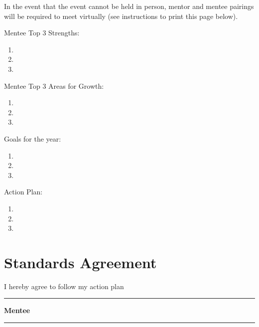 \documentclass[
  openany]{book}
\providecommand{\tightlist}{%
  \setlength{\itemsep}{0pt}\setlength{\parskip}{0pt}}
\begin{document}
In the event that the event cannot be held in person, mentor and mentee pairings will be required to meet virtually (see instructions to print this page below).

Mentee Top 3 Strengths:

\begin{enumerate}
\def\labelenumi{\arabic{enumi}.}
\tightlist
\item
\item
\item
\end{enumerate}

Mentee Top 3 Areas for Growth:

\begin{enumerate}
\def\labelenumi{\arabic{enumi}.}
\tightlist
\item
\item
\item
\end{enumerate}

Goals for the year:

\begin{enumerate}
\def\labelenumi{\arabic{enumi}.}
\tightlist
\item
\item
\item
\end{enumerate}

Action Plan:

\begin{enumerate}
\def\labelenumi{\arabic{enumi}.}
\tightlist
\item
\item
\item
\end{enumerate}

\hypertarget{standards-agreement}{%
\section{Standards Agreement}\label{standards-agreement}}

I hereby agree to follow my action plan\\

\begin{center}\rule{0.5\linewidth}{0.5pt}\end{center}

\textbf{Mentee}

\begin{center}\rule{0.5\linewidth}{0.5pt}\end{center}
\end{document}
